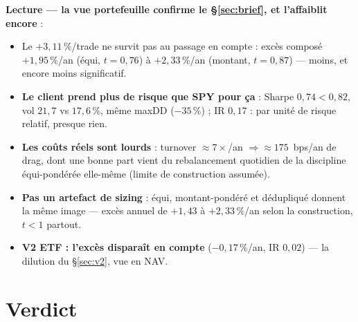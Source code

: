 \documentclass[11pt,a4paper]{article}
\begin{document}
\textbf{Lecture --- la vue portefeuille confirme le \S\ref{sec:brief}, et l'affaiblit encore} :
\begin{itemize}[leftmargin=1.4em,itemsep=1pt]
\item Le $+3{,}11\,\%$/trade ne survit pas au passage en compte : excès composé $+1{,}95\,\%$/an (équi,
      $t=0{,}76$) à $+2{,}33\,\%$/an (montant, $t=0{,}87$) --- moins, et encore moins significatif.
\item \textbf{Le client prend plus de risque que SPY pour ça} : Sharpe $0{,}74<0{,}82$, vol $21{,}7$ vs
      $17{,}6\,\%$, même maxDD ($-35\,\%$) ; IR $0{,}17$ : par unité de risque relatif, presque rien.
\item \textbf{Les coûts réels sont lourds} : turnover $\approx7\times$/an $\Rightarrow\approx175$~bps/an de
      drag, dont une bonne part vient du rebalancement quotidien de la discipline équi-pondérée elle-même
      (limite de construction assumée).
\item \textbf{Pas un artefact de sizing} : équi, montant-pondéré et dédupliqué donnent la même image ---
      excès annuel de $+1{,}43$ à $+2{,}33\,\%$/an selon la construction, $t<1$ partout.
\item \textbf{V2 ETF : l'excès disparaît en compte} ($-0{,}17\,\%$/an, IR $0{,}02$) --- la dilution du
      \S\ref{sec:v2}, vue en NAV.
\end{itemize}

\section{Verdict}\label{sec:verdict}
\end{document}
